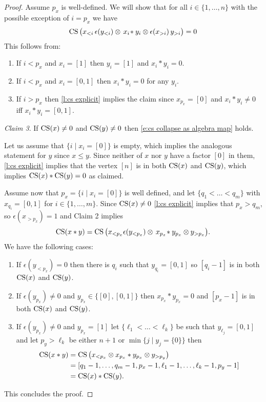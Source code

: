 \begin{proof}
	Assume $p_x$ is well-defined.
	We will show that for all $i \in \{1,\dots,n\}$ with the possible exception of $i = p_x$ we have
	\begin{equation} \label{e:case main lemma third claim}
		\operatorname{CS} \big( x_{<i} \, \epsilon(y_{<i}) \otimes \, x_{i} \! \ast y_{i} \otimes \epsilon(x_{>i}) \, y_{>i} \big) = 0
	\end{equation}
	This follows from:
	\begin{enumerate}
		\item If $i < p_x$ and $x_i = [1]$ then $y_i = [1]$ and $x_i \ast y_i = 0$.
		\item If $i < p_x$ and $x_i = [0,1]$ then $x_i \ast y_i = 0$ for any $y_i$.
		\item If $i > p_x$ then \cref{l:cs explicit} implies the claim since $x_{p_x} = [0]$ and $x_i \ast y_i \neq 0$ iff $x_i \ast y_i = [0,1]$.
	\end{enumerate}

	\noindent \textit{Claim 3}.
	If $\operatorname{CS}(x) \neq 0$ and $\operatorname{CS}(y) \neq 0$ then \eqref{e:cs collapse as algebra map} holds.

	\medskip Let us assume that $\big\{ i \mid x_i = [0] \big\}$ is empty, which implies the analogous statement for $y$ since $x \leq y$.
	Since neither of $x$ nor $y$ have a factor $[0]$ in them, \cref{l:cs explicit} implies that the vertex $[n]$ is in both $\operatorname{CS}(x)$ and $\operatorname{CS}(y)$, which implies $\operatorname{CS}(x) \ast \operatorname{CS}(y) = 0$ as claimed.

	Assume now that $p_x = \big\{ i \mid x_i = [0] \big\}$ is well defined, and let $\{q_1 < \dots < q_m\}$ with $x_{q_i} = [0,1]$ for $i \in \{1,\dots,m\}$.
	Since $\operatorname{CS}(x) \neq 0$ \cref{l:cs explicit} implies that $p_x > q_m$, so $\epsilon(x_{>p_x}) = 1$ and Claim 2 implies
	\[
	\operatorname{CS}(x \ast y) =
	\operatorname{CS} \big( x_{<p_x} \epsilon(y_{<p_x}) \otimes \, x_{p_x} \! \ast y_{p_x} \otimes y_{>p_x} \big).
	\]
	We have the following cases:
	\begin{enumerate}
		\item If $\epsilon(y_{<p_x}) = 0$ then there is $q_i$ such that $y_{q_i} = [0,1]$ so $[q_i-1]$ is in both $\operatorname{CS}(x)$ and $\operatorname{CS}(y)$.
		\item If $\epsilon(y_{p_x}) \neq 0$ and $y_{p_x} \in \{[0], [0,1]\}$ then $x_{p_x} \ast y_{p_x} = 0$ and $[p_x-1]$ is in both $\operatorname{CS}(x)$ and $\operatorname{CS}(y)$.
		\item If $\epsilon(y_{p_x}) \neq 0$ and $y_{p_x} = [1]$ let $\{\ell_1 < \dots < \ell_k\}$ be such that $y_{\ell_j} = [0,1]$ and let $p_y > \ell_k$ be either $n+1$ or $\min\{j \mid y_j = \{0\}\}$ then
		\begin{align*}
			\operatorname{CS}(x \ast y) & =
			\operatorname{CS} \big( x_{< p_x} \otimes x_{p_x} \ast y_{p_x} \otimes y_{> p_y} \big) \\ & =
			[q_1-1, \dots, q_m-1, p_x-1, \ell_1-1, \dots, \ell_k-1, p_y-1] \\ & =
			\operatorname{CS}(x) \ast \operatorname{CS}(y).
		\end{align*}
	\end{enumerate}
	This concludes the proof.
\end{proof}


